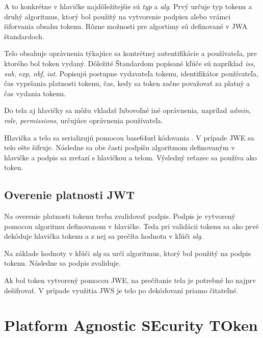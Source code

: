 A to konkrétne v hlavičke najdôležitejšie sú \textit{typ} a \textit{alg}. Prvý určuje typ tokenu a druhý algoritmus, ktorý bol použitý na vytvorenie podpisu alebo vrámci šiforvania obsahu tokenu. Rôzne možnosti pre algortimy sú definované v JWA štandardoch.

Telo obsahuje oprávnenia týkajúce sa kontrétnej autentifikácie a používateľa, pre ktorého bol token vydaný. Dôležité Štandardom popísané kľúče sú napríklad \textit{iss}, \textit{sub}, \textit{exp}, \textit{nbf}, \textit{iat}. Popisujú postupne vydavateľa tokenu, identifikátor používateľa, čas vypršania platnosti tokenu, čas, kedy sa token začne považovať za platný a čas vydania tokenu.

Do tela aj hlavičky sa môžu vkladať ľubovoľné iné oprávnenia, naprílad \textit{admin}, \textit{role}, \textit{permissions}, určujúce oprávnenia používateľa.

Hlavička a telo sa serializujú pomocou base64url kódovania \cite{base64_rfc}. V prípade JWE sa telo ešte šifruje. Následne sa obe časti podpíšu algoritmom definovaným v hlavičke a podpis sa zreťazí s hlavičkou a telom. Výsledný reťazec sa používa ako token.

\subsection{Overenie platnosti JWT}

Na overenie platnosti tokenu treba zvalidovať podpis. Podpis je vytvorený pomocou algoritmu definovanom v hlavičke. Teda pri validácii tokenu sa ako prvé dekóduje hlavička tokenu a z nej sa prečíta hodnota v kľúči \textit{alg}.

Na základe hodnoty v kľúči \textit{alg} sa určí algoritmus, ktorý bol použitý na podpis tokenu. Následne sa podpis zvaliduje. 

Ak bol token vytvorený pomocou JWE, na prečítanie tela je potrebné ho najprv dešifrovať. V prípade využitia JWS je telo po dekódovaní priamo čitateľné.

\section{Platform Agnostic SEcurity TOken}


